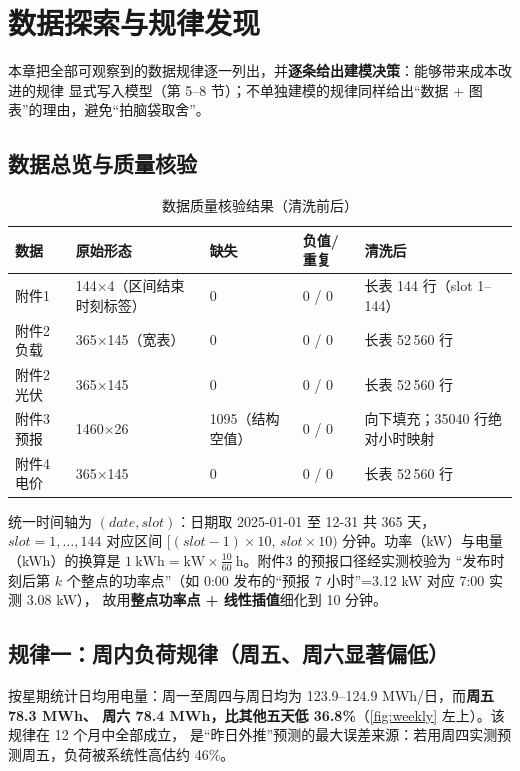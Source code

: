 \section{数据探索与规律发现}

本章把全部可观察到的数据规律逐一列出，并\textbf{逐条给出建模决策}：能够带来成本改进的规律
显式写入模型（第 5--8 节）；不单独建模的规律同样给出“数据 + 图表”的理由，避免“拍脑袋取舍”。

\subsection{数据总览与质量核验}

\begin{table}[htbp]
\centering
\caption{数据质量核验结果（清洗前后）}
\label{tab:quality}
\small
\begin{tabular}{@{}lllll@{}}
\toprule
数据 & 原始形态 & 缺失 & 负值/重复 & 清洗后 \\
\midrule
附件1 & 144$\times$4（区间结束时刻标签） & 0 & 0 / 0 & 长表 144 行（slot 1--144） \\
附件2 负载 & 365$\times$145（宽表） & 0 & 0 / 0 & 长表 52\,560 行 \\
附件2 光伏 & 365$\times$145 & 0 & 0 / 0 & 长表 52\,560 行 \\
附件3 预报 & 1460$\times$26 & 1095（结构空值） & 0 / 0 & 向下填充；35040 行绝对小时映射 \\
附件4 电价 & 365$\times$145 & 0 & 0 / 0 & 长表 52\,560 行 \\
\bottomrule
\end{tabular}
\end{table}

统一时间轴为 $(date,slot)$：日期取 2025-01-01 至 12-31 共 365 天，$slot=1,\dots,144$
对应区间 $[(slot-1)\times10,\,slot\times10)$ 分钟。功率（kW）与电量（kWh）的换算是
$1\ \text{kWh}=\text{kW}\times\frac{10}{60}\ \text{h}$。附件3 的预报口径经实测校验为
“发布时刻后第 $k$ 个整点的功率点”（如 0:00 发布的“预报 7 小时”=3.12 kW 对应 7:00 实测 3.08 kW），
故用\textbf{整点功率点 + 线性插值}细化到 10 分钟。

\subsection{规律一：周内负荷规律（周五、周六显著偏低）}

按星期统计日均用电量：周一至周四与周日均为 123.9--124.9 MWh/日，而\textbf{周五 78.3 MWh、
周六 78.4 MWh，比其他五天低 36.8\%}（\cref{fig:weekly} 左上）。该规律在 12 个月中全部成立，
是“昨日外推”预测的最大误差来源：若用周四实测预测周五，负荷被系统性高估约 46\%。

